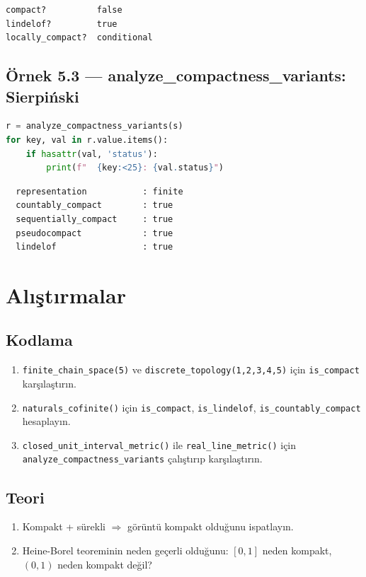 \begin{verbatim}
compact?          false
lindelof?         true
locally_compact?  conditional
\end{verbatim}

\subsection*{Örnek 5.3 — analyze\_compactness\_variants: Sierpiński}

\begin{lstlisting}[language=Python]
r = analyze_compactness_variants(s)
for key, val in r.value.items():
    if hasattr(val, 'status'):
        print(f"  {key:<25}: {val.status}")
\end{lstlisting}

\begin{verbatim}
  representation           : finite
  countably_compact        : true
  sequentially_compact     : true
  pseudocompact            : true
  lindelof                 : true
\end{verbatim}

\section{Alıştırmalar}

\subsection*{Kodlama}

\begin{enumerate}[label=K\arabic*.]
\item \texttt{finite\_chain\_space(5)} ve \texttt{discrete\_topology(1,2,3,4,5)} için
      \texttt{is\_compact} karşılaştırın.
\item \texttt{naturals\_cofinite()} için \texttt{is\_compact}, \texttt{is\_lindelof},
      \texttt{is\_countably\_compact} hesaplayın.
\item \texttt{closed\_unit\_interval\_metric()} ile \texttt{real\_line\_metric()} için
      \texttt{analyze\_compactness\_variants} çalıştırıp karşılaştırın.
\end{enumerate}

\subsection*{Teori}

\begin{enumerate}[label=T\arabic*.]
\item Kompakt + sürekli $\Rightarrow$ görüntü kompakt olduğunu ispatlayın.
\item Heine-Borel teoreminin neden geçerli olduğunu: $[0,1]$ neden kompakt,
      $(0,1)$ neden kompakt değil?
\end{enumerate}
